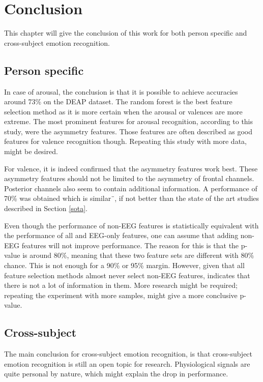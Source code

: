 \chapter{Conclusion}
{\samenvatting This chapter will give the conclusion of this work for both person specific and cross-subject emotion recognition.}

\section{Person specific}
In case of arousal, the conclusion is that it is possible to achieve accuracies around 73\% on the DEAP dataset. The random forest is the best feature selection method as it is more certain when the arousal or valences are more extreme. The most prominent features for arousal recognition, according to this study, were the asymmetry features. Those features are often described as good features for valence recognition though. Repeating this study with more data, might be desired.

\npar

For valence, it is indeed confirmed that the asymmetry features work best. These asymmetry features should not be limited to the asymmetry of frontal channels. Posterior channels also seem to contain additional information. A performance of 70\% was obtained which is similar¨, if not better than the state of the art studies described in Section \ref{sota}. 

\npar

Even though the performance of non-EEG features is statistically equivalent with the performance of all and EEG-only features, one can assume that adding non-EEG features will not improve performance. The reason for this is that the p-value is around 80\%, meaning that these two feature sets are different with 80\% chance. This is not enough for a 90\% or 95\% margin. However, given that all feature selection methods almost never select non-EEG features, indicates that there is not a lot of information in them. More research might be required; repeating the experiment with more samples, might give a more conclusive p-value.

\clearpage

\section{Cross-subject}

The main conclusion for cross-subject emotion recognition, is that cross-subject emotion recognition is still an open topic for research. Physiological signals are quite personal by nature, which might explain the drop in performance.

